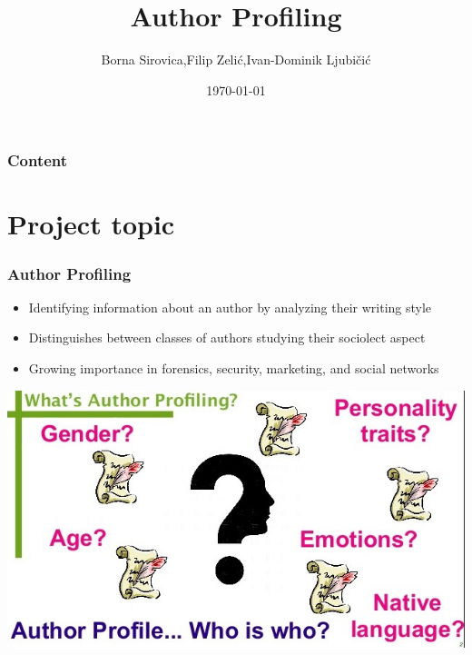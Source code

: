 \documentclass[slidestop,compress,11pt,xcolor=dvipsnames]{beamer}
\title[Author Profiling]{Author Profiling} %
\author{Borna Sirovica,Filip Zelić,Ivan-Dominik Ljubičić} %
\institute[FER] %
{
Fakultet elektrotehnike i računarstva \\ %
\medskip

}
\date{\today} %
\begin{document}
\begin{frame}
\titlepage %
\end{frame}

\begin{frame}
\frametitle{Content} %
\tableofcontents %
\end{frame}


\section{Project topic} %

\begin{frame}
\frametitle{Author Profiling}
\begin{itemize}
	\item Identifying information about an author by analyzing their writing style
	\item Distinguishes between classes of authors studying their sociolect aspect
	\item Growing importance in forensics, security, marketing, and social networks

	
	
\end{itemize}
	\vspace{3mm}
	\centerline{\includegraphics[scale=0.35]{author-profiling-task}}

\end{frame}
\end{document}
